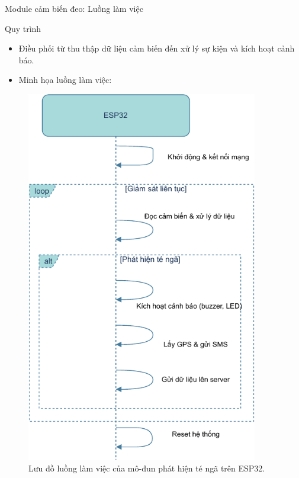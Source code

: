 \begin{frame}[fragile]{Module cảm biến đeo: Luồng làm việc}
    \begin{block}{Quy trình}
        \begin{itemize}
            \item Điều phối từ thu thập dữ liệu cảm biến đến xử lý sự kiện và kích hoạt cảnh báo.
            \item Minh họa luồng làm việc:
        \end{itemize}
    \end{block}
    \begin{figure}
        \centering
        \includegraphics[width=0.9\textwidth,height=0.5\textheight,keepaspectratio]{images/module1_time_flow.pdf}
        \caption{Lưu đồ luồng làm việc của mô-đun phát hiện té ngã trên ESP32.}
        \label{fig:module1_flow}
    \end{figure}
\end{frame}

